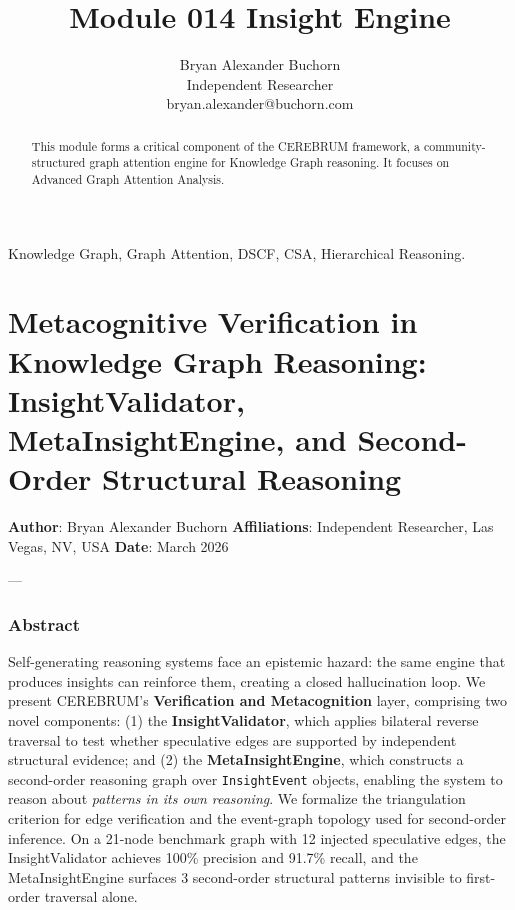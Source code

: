 \documentclass[10pt,journal,compsoc]{IEEEtran}
\begin{document}
\title{Module 014 Insight Engine}
\author{Bryan Alexander Buchorn \\ Independent Researcher \\ bryan.alexander@buchorn.com}

\maketitle

\begin{abstract}
This module forms a critical component of the CEREBRUM framework, a community-structured graph attention engine for Knowledge Graph reasoning. It focuses on Advanced Graph Attention Analysis.
\end{abstract}

\begin{IEEEkeywords}
Knowledge Graph, Graph Attention, DSCF, CSA, Hierarchical Reasoning.
\end{IEEEkeywords}

\section{Metaco\-gnitive Verifi\-cation in Knowledge Graph Reasoning: InsightValidator, MetaInsightEngine, and Second-Order Structural Reasoning}

\textbf{Author}: Bryan Alexander Buchorn
\textbf{Affili\-ations}: Independent Researcher, Las Vegas, NV, USA
\textbf{Date}: March 2026

---

\subsubsection{Abstract}
Self-generating reasoning systems face an epistemic hazard: the same engine that produces insights can reinforce them, creating a closed hallu\-cination loop. We present CEREBRUM's \textbf{Verifi\-cation and Metaco\-gnition} layer, comprising two novel components: (1) the \textbf{InsightValidator}, which applies bilateral reverse traversal to test whether speculative edges are supported by independent structural evidence; and (2) the \textbf{MetaInsightEngine}, which constructs a second-order reasoning graph over \texttt{InsightEvent} objects, enabling the system to reason about \textit{patterns in its own reasoning}. We formalize the trian\-gulation criterion for edge verif\-ication and the event-graph topology used for second-order inference. On a 21-node benchmark graph with 12 injected speculative edges, the InsightValidator achieves 100\% precision and 91.7\% recall, and the MetaInsightEngine surfaces 3 second-order structural patterns invisible to first-order traversal alone.
\end{document}
